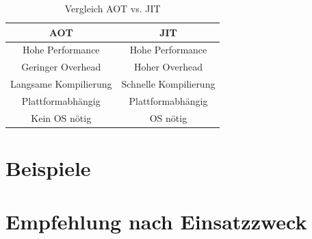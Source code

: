     \begin{table}[ht]
            \begin{center}
                \begin{tabular}{| c | c |}
                    \hline
                    \textbf{AOT}                                & \textbf{JIT}                \\
                    \hline
                    \hline
                    Hohe Performance & Hohe Performance\\
                    \hline
                    Geringer Overhead & Hoher Overhead\\
                    \hline
                    Langsame Kompilierung & Schnelle Kompilierung \\
                    \hline
                    Plattformabhängig & Plattformabhängig \\
                    \hline
                    Kein OS nötig & OS nötig\\        
        \hline
                \end{tabular}
        \end{center}
        \caption{Vergleich AOT vs. JIT}
    \label{vergleich_table}
\end{table}

\section{Beispiele}

\section{Empfehlung nach Einsatzzweck} %
